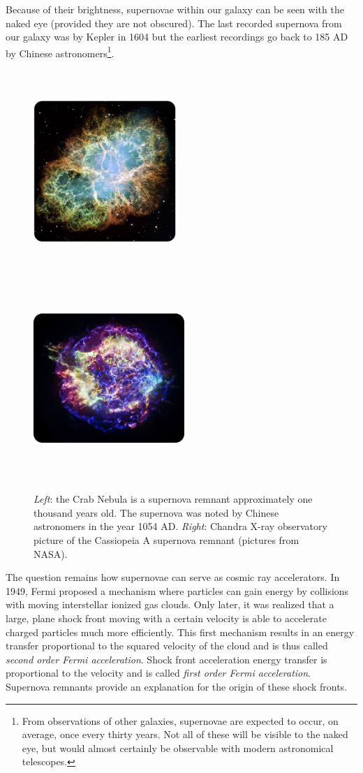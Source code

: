 Because of their brightness, supernovae within our galaxy can be seen with the naked eye (provided they are not obscured). The last recorded supernova from our galaxy was by Kepler in 1604 but the earliest recordings go back to 185 AD by Chinese astronomers\footnote{From observations of other galaxies, supernovae are expected to occur, on average, once every thirty years. Not all of these will be visible to the naked eye, but would almost certainly be observable with modern astronomical telescopes.}.
\begin{figure}
\centering
\includegraphics[width=0.48\textwidth,height=7.7cm]{chapter3/img/crabnebula_rounded.jpg}
\includegraphics[width=0.51\textwidth,height=7.7cm]{chapter3/img/casa_rounded_resized.jpg}
\caption{\textit{Left}: the Crab Nebula is a supernova remnant approximately one thousand years old. The supernova was noted by Chinese astronomers in the year 1054 AD. \textit{Right}: Chandra X-ray observatory picture of the Cassiopeia A supernova remnant (pictures from NASA).}
\label{fig:supernova}
\end{figure}
\newline
The question remains how supernovae can serve as cosmic ray accelerators. In 1949, Fermi proposed a mechanism where particles can gain energy by collisions with moving interstellar ionized gas clouds. Only later, it was realized that a large, plane shock front moving with a certain velocity is able to accelerate charged particles much more efficiently. This first mechanism results in an energy transfer proportional to the squared velocity of the cloud and is thus called \textit{second order Fermi acceleration}. Shock front acceleration energy transfer is proportional to the velocity and is called \textit{first order Fermi acceleration}. Supernova remnants provide an explanation for the origin of these shock fronts.

